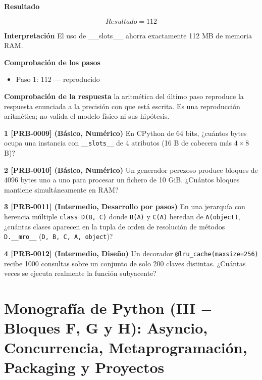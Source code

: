 \documentclass{book}
\begin{document}
\begin{tcolorbox}[title={Problema resuelto}, studiumworked, breakable]
\noindent\textbf{Resultado}

\[
Resultado = 112
\]

\noindent\textbf{Interpretación}
El uso de \_\_slots\_\_ ahorra exactamente 112 MB de memoria RAM.

\noindent\textbf{Comprobación de los pasos}
\begin{itemize}
\item Paso 1: $112$ — reproducido
\end{itemize}

\noindent\textbf{Comprobación de la respuesta} la aritmética del último paso reproduce la respuesta enunciada a la precisión con que está escrita. Es una reproducción aritmética; no valida el modelo físico ni sus hipótesis.
\end{tcolorbox}

\begin{tcolorbox}[title={Ejercicios}, studiumworked, breakable]

\noindent\textbf{1 [PRB-0009] (Básico, Numérico)}
En CPython de 64 bits, ¿cuántos bytes ocupa una instancia con \texttt{\_\_slots\_\_} de 4 atributos (16 B de cabecera más \(4 \times 8\) B)?

\noindent\textbf{2 [PRB-0010] (Básico, Numérico)}
Un generador perezoso produce bloques de 4096 bytes uno a uno para procesar un fichero de 10 GiB. ¿Cuántos bloques mantiene simultáneamente en RAM?

\noindent\textbf{3 [PRB-0011] (Intermedio, Desarrollo por pasos)}
En una jerarquía con herencia múltiple \texttt{class D(B, C)} donde \texttt{B(A)} y \texttt{C(A)} heredan de \texttt{A(object)}, ¿cuántas clases aparecen en la tupla de orden de resolución de métodos \texttt{D.\_\_mro\_\_} (\texttt{D, B, C, A, object})?

\noindent\textbf{4 [PRB-0012] (Intermedio, Diseño)}
Un decorador \texttt{@lru\_cache(maxsize=256)} recibe 1000 consultas sobre un conjunto de solo 200 claves distintas. ¿Cuántas veces se ejecuta realmente la función subyacente?
\end{tcolorbox}

\chapter{Monografía de Python (III \(-\) Bloques F, G y H): Asyncio, Concurrencia, Metaprogramación, Packaging y Proyectos}
\label{chap:cap03-python-experto-asyncio-concurrencia-metaclases-packaging-proyectos}
\end{document}

